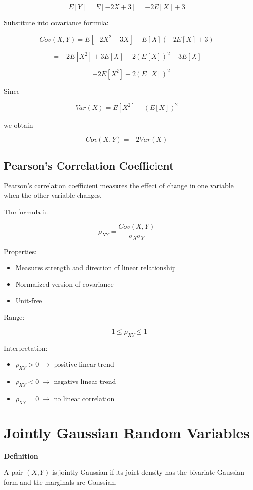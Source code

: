 \documentclass{article}
\begin{document}
\[
E[Y]=E[-2X+3]=-2E[X]+3
\]

Substitute into covariance formula:

\[
Cov(X,Y)=E[-2X^2+3X]-E[X](-2E[X]+3)
\]

\[
=-2E[X^2]+3E[X]+2(E[X])^2-3E[X]
\]

\[
=-2E[X^2]+2(E[X])^2
\]

Since

\[
Var(X)=E[X^2]-(E[X])^2
\]

we obtain

\[
Cov(X,Y)=-2Var(X)
\]

\subsection{Pearson’s Correlation Coefficient}

Pearson’s correlation coefficient measures the effect of change in one variable when the other variable changes.

The formula is

\[
\rho_{XY}=\frac{Cov(X,Y)}{\sigma_X\sigma_Y}
\]

Properties:

\begin{itemize}
\item Measures strength and direction of linear relationship
\item Normalized version of covariance
\item Unit-free
\end{itemize}

Range:

\[
-1 \le \rho_{XY} \le 1
\]

Interpretation:

\begin{itemize}
\item $\rho_{XY}>0$ $\rightarrow$ positive linear trend
\item $\rho_{XY}<0$ $\rightarrow$ negative linear trend
\item $\rho_{XY}=0$ $\rightarrow$ no linear correlation
\end{itemize}

\section{Jointly Gaussian Random Variables}

\textbf{Definition}

A pair $(X,Y)$ is jointly Gaussian if its joint density has the bivariate Gaussian form and the marginals are Gaussian.
\end{document}
